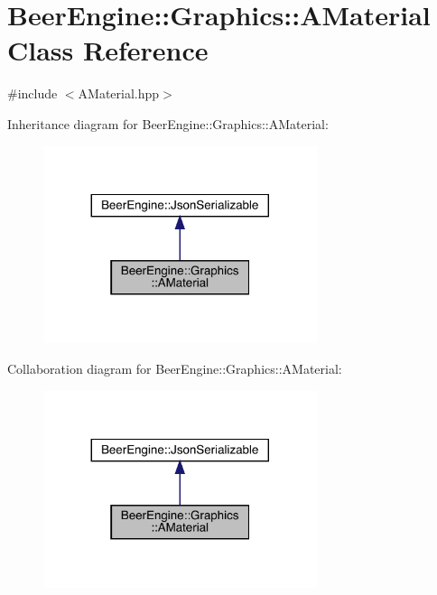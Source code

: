 \hypertarget{class_beer_engine_1_1_graphics_1_1_a_material}{}\section{Beer\+Engine\+:\+:Graphics\+:\+:A\+Material Class Reference}
\label{class_beer_engine_1_1_graphics_1_1_a_material}


{\ttfamily \#include $<$A\+Material.\+hpp$>$}



Inheritance diagram for Beer\+Engine\+:\+:Graphics\+:\+:A\+Material\+:
\nopagebreak
\begin{figure}[H]
\begin{center}
\leavevmode
\includegraphics[width=227pt]{class_beer_engine_1_1_graphics_1_1_a_material__inherit__graph}
\end{center}
\end{figure}


Collaboration diagram for Beer\+Engine\+:\+:Graphics\+:\+:A\+Material\+:
\nopagebreak
\begin{figure}[H]
\begin{center}
\leavevmode
\includegraphics[width=227pt]{class_beer_engine_1_1_graphics_1_1_a_material__coll__graph}
\end{center}
\end{figure}
